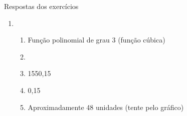 \begin{frame}[allowframebreaks]{Respostas dos exercícios}
\begin{enumerate}
        \item
        \begin{enumerate}[a]
            \item Função polinomial de grau 3 (função cúbica)
            \item \begin{figure}[h]
                    \centering
                  \end{figure}
            \item 1550,15
            \item 0,15
            \item Aproximadamente 48 unidades (tente pelo gráfico)
        \end{enumerate}
        
    \end{enumerate}
\end{frame}